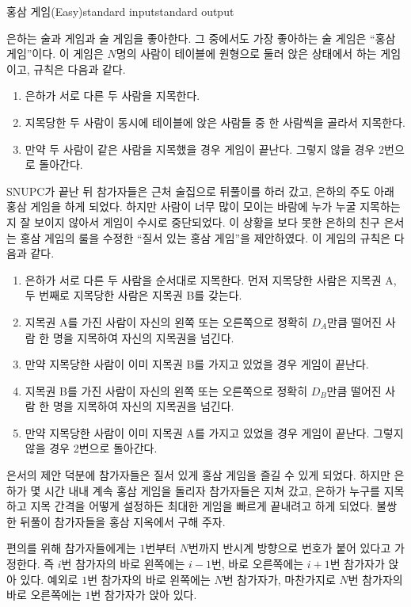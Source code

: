 \begin{problem}{홍삼 게임(Easy)}{standard input}{standard output}

은하는 술과 게임과 술 게임을 좋아한다. 그 중에서도 가장 좋아하는 술 게임은 ``홍삼 게임''이다. 이 게임은 $N$명의 사람이 테이블에 원형으로 둘러 앉은 상태에서 하는 게임이고, 규칙은 다음과 같다.

\begin{enumerate}
\item{은하가 서로 다른 두 사람을 지목한다.}
\item{지목당한 두 사람이 동시에 테이블에 앉은 사람들 중 한 사람씩을 골라서 지목한다.}
\item{만약 두 사람이 같은 사람을 지목했을 경우 게임이 끝난다. 그렇지 않을 경우 2번으로 돌아간다.}
\end{enumerate}

SNUPC가 끝난 뒤 참가자들은 근처 술집으로 뒤풀이를 하러 갔고, 은하의 주도 아래 홍삼 게임을 하게 되었다. 하지만 사람이 너무 많이 모이는 바람에 누가 누굴 지목하는지 잘 보이지 않아서 게임이 수시로 중단되었다. 이 상황을 보다 못한 은하의 친구 은서는 홍삼 게임의 룰을 수정한 ``질서 있는 홍삼 게임''을 제안하였다. 이 게임의 규칙은 다음과 같다.

\begin{enumerate}
\item{은하가 서로 다른 두 사람을 순서대로 지목한다. 먼저 지목당한 사람은 지목권 A, 두 번째로 지목당한 사람은 지목권 B를 갖는다.}
\item{지목권 A를 가진 사람이 자신의 왼쪽 또는 오른쪽으로 정확히 $D_{A}$만큼 떨어진 사람 한 명을 지목하여 자신의 지목권을 넘긴다.}
\item{만약 지목당한 사람이 이미 지목권 B를 가지고 있었을 경우 게임이 끝난다.}
\item{지목권 B를 가진 사람이 자신의 왼쪽 또는 오른쪽으로 정확히 $D_{B}$만큼 떨어진 사람 한 명을 지목하여 자신의 지목권을 넘긴다.}
\item{만약 지목당한 사람이 이미 지목권 A를 가지고 있었을 경우 게임이 끝난다. 그렇지 않을 경우 2번으로 돌아간다.}
\end{enumerate}

은서의 제안 덕분에 참가자들은 질서 있게 홍삼 게임을 즐길 수 있게 되었다. 하지만 은하가 몇 시간 내내 계속 홍삼 게임을 돌리자 참가자들은 지쳐 갔고, 은하가 누구를 지목하고 지목 간격을 어떻게 설정하든 최대한 게임을 빠르게 끝내려고 하게 되었다. 불쌍한 뒤풀이 참가자들을 홍삼 지옥에서 구해 주자.

편의를 위해 참가자들에게는 $1$번부터 $N$번까지 반시계 방향으로 번호가 붙어 있다고 가정한다. 즉 $i$번 참가자의 바로 왼쪽에는 $i-1$번, 바로 오른쪽에는 $i+1$번 참가자가 앉아 있다. 예외로 $1$번 참가자의 바로 왼쪽에는 $N$번 참가자가, 마찬가지로 $N$번 참가자의 바로 오른쪽에는 $1$번 참가자가 앉아 있다.


\end{problem}

